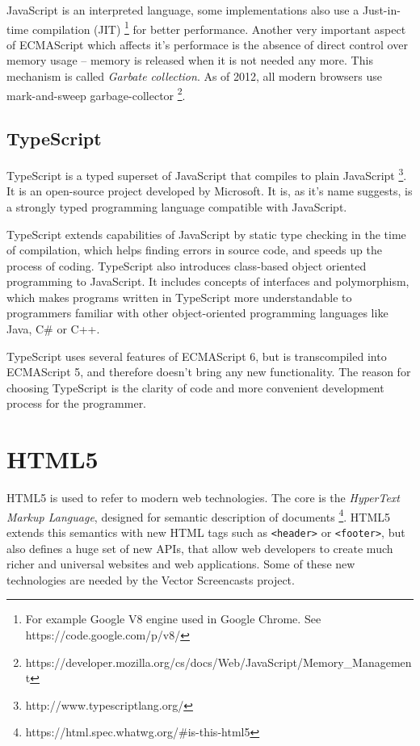 JavaScript is an interpreted language, some implementations also use a Just-in-time compilation (JIT) \footnote{For example Google V8 engine used in Google Chrome. See https://code.google.com/p/v8/} for better performance.  Another very important aspect of ECMAScript which affects it's performace is the absence of direct control over memory usage -- memory is released when it is not needed any more. This mechanism is called \textit{Garbate collection}. As of 2012, all modern browsers use mark-and-sweep garbage-collector \cite{}\footnote{https://developer.mozilla.org/cs/docs/Web/JavaScript/Memory\_Management}.

\subsection{TypeScript}
TypeScript is a typed superset of JavaScript that compiles to plain JavaScript\cite{} \footnote{http://www.typescriptlang.org/}. It is an open-source project developed by Microsoft. It is, as it's name suggests, is a strongly typed programming language compatible with JavaScript.

TypeScript extends capabilities of JavaScript by static type checking in the time of compilation, which helps finding errors in source code, and speeds up the process of coding. TypeScript also introduces class-based object oriented programming to JavaScript. It includes concepts of interfaces and polymorphism, which makes programs written in TypeScript more understandable to programmers familiar with other object-oriented programming languages like Java, C\# or C++.

TypeScript uses several features of ECMAScript 6, but is transcompiled into ECMAScript 5, and therefore doesn't bring any new functionality. The reason for choosing TypeScript is the clarity of code and more convenient development process for the programmer.








\section{HTML5}

HTML5 is used to refer to modern web technologies. The core is the \textit{HyperText Markup Language}, designed for semantic description of documents \cite{}\footnote{https://html.spec.whatwg.org/\#is-this-html5}. HTML5 extends this semantics with new HTML tags such as \verb|<header>| or \verb|<footer>|, but also defines a huge set of new APIs, that allow web developers to create much richer and universal websites and web applications. Some of these new technologies are needed by the Vector Screencasts project.

